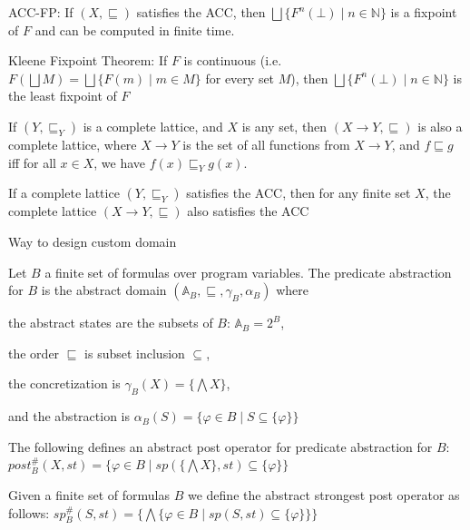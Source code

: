 \documentclass[landscape, a4paper]{article}
\begin{document}
\begin{minipage}[t]{0.2\linewidth}
\begin{betterlist}
\begin{betterlist}
			\item \alert{ACC-FP}: If $(X, \sqsubseteq)$ satisfies the ACC, then $\bigsqcup\{F^n(\bot) \mid n \in  \mathbb{N}\}$ is a fixpoint of $F$ and can be computed in finite time. 
			\item \alert{Kleene Fixpoint Theorem}: If $F$ is continuous (i.e. $F(\bigsqcup M) = \bigsqcup \{F(m) \mid m \in M\}$ for every set $M$), then $\bigsqcup\{F^n(\bot) \mid n \in \mathbb{N}\}$ is the least fixpoint of $F$
			\item {}
		\end{betterlist}
		\item If $(Y, \sqsubseteq_Y)$ is a complete lattice, and $X$ is any set, then $(X\rightarrow Y, \sqsubseteq)$ is also a complete lattice, where $X \rightarrow Y$ is the set of all functions from $X \rightarrow Y$, and $f \sqsubseteq g$ iff for all $x \in X$, we have $f(x) \sqsubseteq_Y g(x)$. 
		\item If a complete lattice $(Y , \sqsubseteq_Y)$ satisfies the ACC, then for any finite set $X$, the complete lattice $(X \rightarrow Y , \sqsubseteq)$ also satisfies the ACC
	\end{betterlist}
	\begin{betterlist}
		\item Way to design custom domain
		\item Let $B$ a finite set of formulas over program variables. The \alert{predicate abstraction for $B$} is the abstract domain $(\mathbb{A}_B, \sqsubseteq, \gamma_B, \alpha_B)$ where
		\begin{betterlist}
			\item the abstract states are the subsets of $B$: $\mathbb{A}_B = 2^B$,
			\item the order $\sqsubseteq$ is subset inclusion $\subseteq$,
			\item the concretization is $\gamma_B(X) = \{\bigwedge X\}$,
			\item and the abstraction is $\alpha_B(S) = \{\varphi \in B \mid S \subseteq \{\varphi\}\}$
		\end{betterlist}
		\item The following defines an abstract post operator for predicate abstraction for $B$: $post^\#_B(X, st) = \{\varphi \in B \mid sp(\{\bigwedge X\}, st) \subseteq \{\varphi\}\}$
		\item Given a finite set of formulas $B$ we define the \alert{abstract strongest post} operator as follows: $sp^\#_B(S, st) = \{\bigwedge \{\varphi \in B \mid sp(S, st) \subseteq \{\varphi\}\}\}$

\end{betterlist}
\end{minipage}
\end{document}
